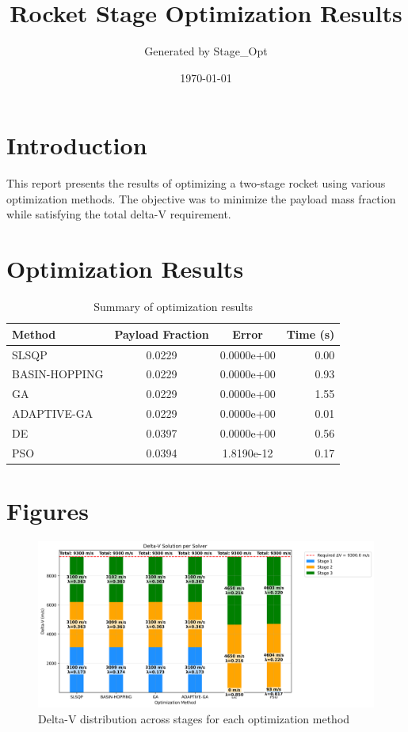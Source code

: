 \documentclass{article}
\title{Rocket Stage Optimization Results}
\author{Generated by Stage\_Opt}
\date{\today}
\begin{document}
\maketitle

\section{Introduction}
This report presents the results of optimizing a two-stage rocket using various optimization methods. The objective was to minimize the payload mass fraction while satisfying the total delta-V requirement.

\section{Optimization Results}
\begin{table}[H]
\centering
\begin{tabular}{lccr}
\toprule
Method & Payload Fraction & Error & Time (s) \\
\midrule
SLSQP & 0.0229 & 0.0000e+00 & 0.00 \\
BASIN-HOPPING & 0.0229 & 0.0000e+00 & 0.93 \\
GA & 0.0229 & 0.0000e+00 & 1.55 \\
ADAPTIVE-GA & 0.0229 & 0.0000e+00 & 0.01 \\
DE & 0.0397 & 0.0000e+00 & 0.56 \\
PSO & 0.0394 & 1.8190e-12 & 0.17 \\
\bottomrule
\end{tabular}
\caption{Summary of optimization results}
\label{tab:results}
\end{table}

\section{Figures}
\begin{figure}[H]
\centering
\includegraphics[width=\textwidth]{dv_breakdown.png}
\caption{Delta-V distribution across stages for each optimization method}
\label{fig:dv-breakdown}
\end{figure}
\end{document}

